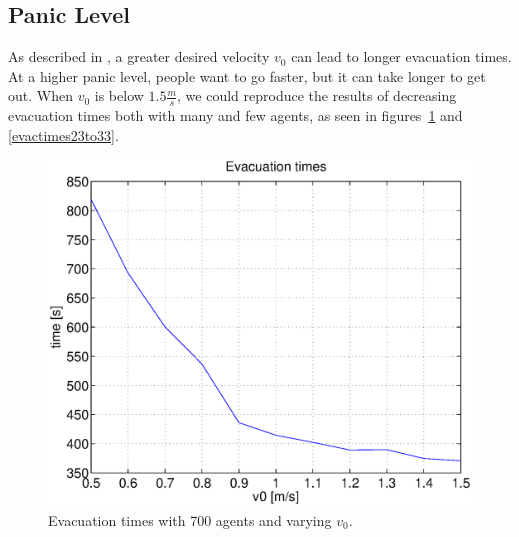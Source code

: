 \documentclass[11pt]{article}
\begin{document}

\FloatBarrier %
\subsection{Panic Level} %
\label{sub:paniclevel}

As described in \cite{helbing}, a greater desired velocity \(v_0\) can lead to
longer evacuation times.  At a higher panic level, people want to go faster,
but it can take longer to get out.  When \(v_0\) is below \(1.5\frac{m}{s}\),
we could reproduce the results of decreasing evacuation times both with many
and few agents, as seen in figures~\ref{evactimes1to11} and
\ref{evactimes23to33}.

\begin{figure}[h]
	\centering
	\includegraphics[scale=0.5]{images/evactimes1to11.eps}
	\caption{Evacuation times with 700 agents and varying \(v_0\).}
	\label{evactimes1to11}
\end{figure}
\end{document}
